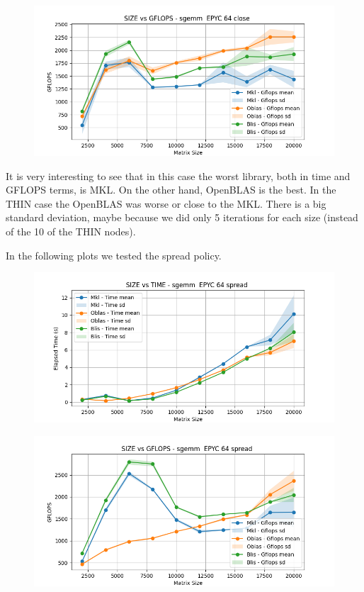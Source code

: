 \documentclass{article}
\begin{document}
\begin{figure}[H]
    \centering
    \includegraphics[width=\textwidth]{EPYC 64/sgemm__EPYC_64_close_gflops.png}
\end{figure}

It is very interesting to see that in this case the worst library, both in time and GFLOPS terms, is MKL. On the other hand, OpenBLAS is the best. In the THIN case the OpenBLAS was worse or close to the MKL. There is a big standard deviation, maybe because we did only 5 iterations for each size (instead of the 10 of the THIN nodes). 

In the following plots we tested the spread policy. 
\begin{figure}[H]
    \centering
    \includegraphics[width=\textwidth]{EPYC 64/sgemm__EPYC_64_spread_time.png}
\end{figure}

\begin{figure}[H]
    \centering
    \includegraphics[width=\textwidth]{EPYC 64/sgemm__EPYC_64_spread_gflops.png}
\end{figure}
\end{document}
